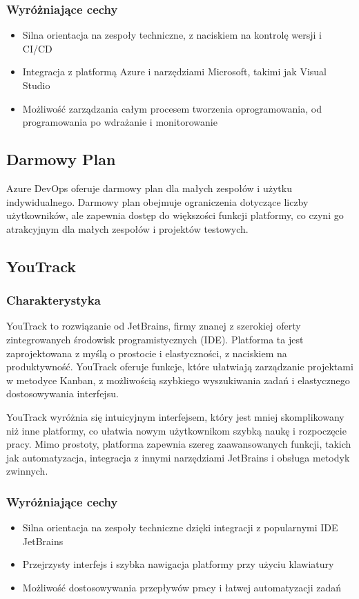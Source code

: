 \subsubsection*{Wyróżniające cechy}
\begin{itemize}
    \item Silna orientacja na zespoły techniczne, z naciskiem na kontrolę wersji i CI/CD
    \item Integracja z platformą Azure i narzędziami Microsoft, takimi jak Visual Studio
    \item Możliwość zarządzania całym procesem tworzenia oprogramowania, od programowania po wdrażanie i monitorowanie
\end{itemize}
\subsection*{Darmowy Plan}
Azure DevOps oferuje darmowy plan dla małych zespołów i użytku indywidualnego. Darmowy plan obejmuje ograniczenia dotyczące liczby użytkowników, ale zapewnia dostęp do większości funkcji platformy, co czyni go atrakcyjnym 
dla małych zespołów i projektów testowych.

\subsection{YouTrack}
\subsubsection*{Charakterystyka}
YouTrack to rozwiązanie od JetBrains, firmy znanej z szerokiej oferty zintegrowanych środowisk programistycznych (IDE). Platforma ta jest zaprojektowana z myślą o prostocie i elastyczności, z naciskiem na produktywność. YouTrack oferuje
funkcje, które ułatwiają zarządzanie projektami w metodyce Kanban, z możliwością szybkiego wyszukiwania zadań i elastycznego dostosowywania interfejsu.

YouTrack wyróżnia się intuicyjnym interfejsem, który jest mniej skomplikowany niż inne platformy, co ułatwia nowym użytkownikom szybką naukę i rozpoczęcie pracy. Mimo prostoty, platforma zapewnia szereg zaawansowanych funkcji,
takich jak automatyzacja, integracja z innymi narzędziami JetBrains i obsługa metodyk zwinnych.
\subsubsection*{Wyróżniające cechy}
\begin{itemize}
    \item Silna orientacja na zespoły techniczne dzięki integracji z popularnymi IDE JetBrains
    \item Przejrzysty interfejs i szybka nawigacja platformy przy użyciu klawiatury
    \item Możliwość dostosowywania przepływów pracy i łatwej automatyzacji zadań
\end{itemize}
